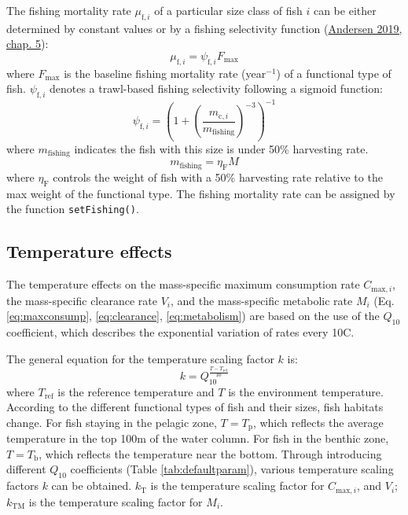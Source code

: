 \documentclass[
]{article}
\begin{document}
The fishing mortality rate \(\mu_{\mathrm{f},i}\) of a particular size
class of fish \(i\) can be either determined by constant values or by a
fishing selectivity function
(\protect\hyperlink{ref-andersen2019fish}{Andersen 2019, chap. 5}):
\begin{equation}
\mu_{\mathrm{f},i}=\psi_{\mathrm{f},i}F_{\mathrm{max}}
\label{eq:fishing}
\end{equation} where \(F_{\mathrm{max}}\) is the baseline fishing
mortality rate (year\(^{-1}\)) of a functional type of fish.
\(\psi_{\mathrm{f},i}\) denotes a trawl-based fishing selectivity
following a sigmoid function: \begin{equation}
\psi_{\mathrm{f},i} = \left(1+\left(\frac{m_{\mathrm{c},i}}{m_{\mathrm{fishing}}}\right)^{-3} \right)^{-1}
\end{equation} where \(m_{\mathrm{fishing}}\) indicates the fish with
this size is under 50\% harvesting rate. \begin{equation}
m_{\mathrm{fishing}}=\eta_{\mathrm{F}} M
\end{equation} where \(\eta_{\mathrm{F}}\) controls the weight of fish
with a 50\% harvesting rate relative to the max weight of the functional
type. The fishing mortality rate can be assigned by the function
\texttt{setFishing()}.

\hypertarget{temperature-effects}{%
\subsection{Temperature effects}\label{temperature-effects}}

The temperature effects on the mass-specific maximum consumption rate
\(C_{\mathrm{max},i}\), the mass-specific clearance rate \(V_{i}\), and
the mass-specific metabolic rate \(M_i\) (Eq. \ref{eq:maxconsump},
\ref{eq:clearance}, \ref{eq:metabolism}) are based on the use of the
\(Q_{10}\) coefficient, which describes the exponential variation of
rates every 10\textdegree{}C.

The general equation for the temperature scaling factor \(k\) is:
\begin{equation}
k = Q_{10}^{\frac{T-T_{\mathrm{ref}}}{10}} \label{eq:Tscfac}
\end{equation} where \(T_{\mathrm{ref}}\) is the reference temperature
and \(T\) is the environment temperature. According to the different
functional types of fish and their sizes, fish habitats change. For fish
staying in the pelagic zone, \(T=T_{\mathrm{p}}\), which reflects the
average temperature in the top 100m of the water column. For fish in the
benthic zone, \(T=T_{\mathrm{b}}\), which reflects the temperature near
the bottom. Through introducing different \(Q_{10}\) coefficients (Table
\ref{tab:defaultparam}), various temperature scaling factors \(k\) can
be obtained. \(k_{\mathrm{T}}\) is the temperature scaling factor for
\(C_{\mathrm{max},i}\), and \(V_{i}\); \(k_{\mathrm{TM}}\) is the
temperature scaling factor for \(M_i\).
\end{document}
